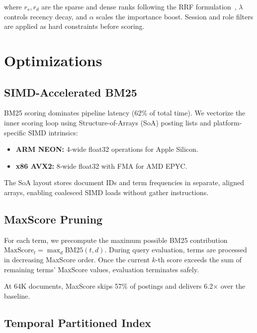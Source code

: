 \documentclass[sigconf,nonacm,anonymous]{acmart}
\newcommand{\speedup}[1]{#1$\times$}
\begin{document}
where $r_s, r_d$ are the sparse and dense ranks following the
RRF formulation~\cite{cormack2009rrf}, $\lambda$ controls recency
decay, and $\alpha$ scales the importance boost.  Session and role
filters are applied as hard constraints before scoring.

\section{Optimizations}
\label{sec:optimizations}

\subsection{SIMD-Accelerated BM25}
\label{sec:simd}

BM25 scoring dominates pipeline latency (62\% of total time).
We vectorize the inner scoring loop using Structure-of-Arrays (SoA)
posting lists and platform-specific SIMD intrinsics:

\begin{itemize}
\item \textbf{ARM NEON:} 4-wide float32 operations for Apple Silicon.
\item \textbf{x86 AVX2:} 8-wide float32 with FMA for AMD EPYC.
\end{itemize}

The SoA layout stores document IDs and term frequencies in separate,
aligned arrays, enabling coalesced SIMD loads without gather
instructions.

\subsection{MaxScore Pruning}

For each term, we precompute the maximum possible BM25 contribution
$\text{MaxScore}_t = \max_{d} \text{BM25}(t, d)$.  During query
evaluation, terms are processed in decreasing MaxScore order.
Once the current $k$-th score exceeds the sum of remaining
terms' MaxScore values, evaluation terminates safely.

At 64K documents, MaxScore skips 57\% of postings and delivers
\speedup{6.2} over the baseline.

\subsection{Temporal Partitioned Index}
\label{sec:temporal}
\end{document}
